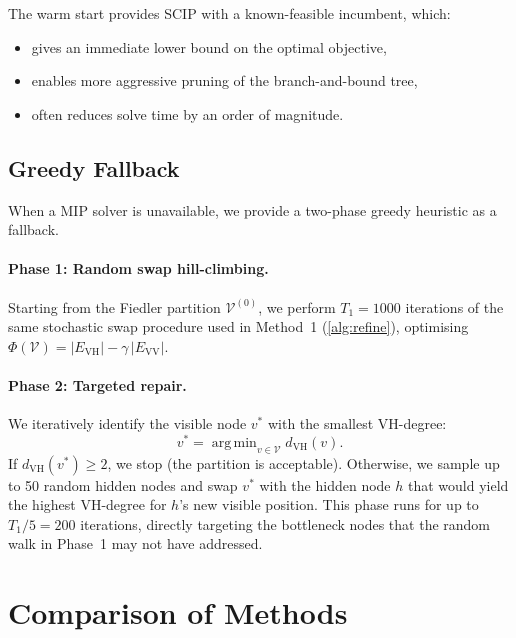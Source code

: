 \documentclass[11pt,a4paper]{article}
\DeclareMathOperator*{\argmin}{arg\,min}
\newcommand{\VV}{\mathcal{V}}
\begin{document}
The warm start provides SCIP with a known-feasible incumbent, which:
\begin{itemize}[nosep]
  \item gives an immediate lower bound on the optimal objective,
  \item enables more aggressive pruning of the branch-and-bound tree,
  \item often reduces solve time by an order of magnitude.
\end{itemize}

\subsection{Greedy Fallback}\label{sec:greedy}

When a MIP solver is unavailable, we provide a two-phase greedy heuristic as a fallback.

\paragraph{Phase 1: Random swap hill-climbing.}  Starting from the Fiedler partition $\VV^{(0)}$, we perform $T_1 = 1000$ iterations of the same stochastic swap procedure used in Method~1 (\cref{alg:refine}), optimising $\Phi(\VV) = |E_{\mathrm{VH}}| - \gamma\,|E_{\mathrm{VV}}|$.

\paragraph{Phase 2: Targeted repair.}  We iteratively identify the visible node $v^*$ with the smallest VH-degree:
\[
  v^* = \argmin_{v\in\VV} d_{\mathrm{VH}}(v).
\]
If $d_{\mathrm{VH}}(v^*) \geq 2$, we stop (the partition is acceptable).  Otherwise, we sample up to 50 random hidden nodes and swap $v^*$ with the hidden node $h$ that would yield the highest VH-degree for $h$'s new visible position.  This phase runs for up to $T_1/5 = 200$ iterations, directly targeting the bottleneck nodes that the random walk in Phase~1 may not have addressed.

\section{Comparison of Methods}\label{sec:comparison}
\end{document}
